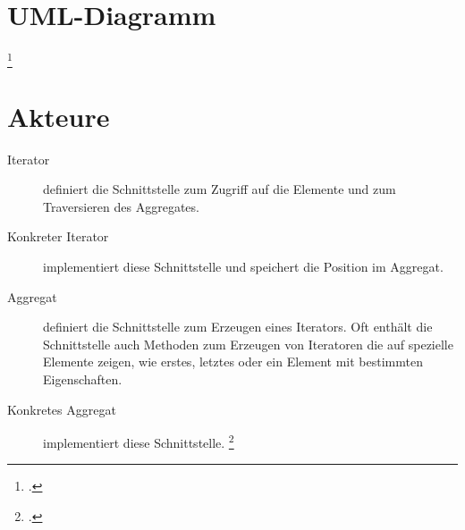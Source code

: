 \documentclass{bschlangaul-haupt}
\begin{document}
\section{UML-Diagramm}

\footcite{wiki:iterator}

%

\section{Akteure}

\begin{description}
\item[Iterator] definiert die Schnittstelle zum Zugriff auf die Elemente
und zum Traversieren des Aggregates.

\item[Konkreter Iterator] implementiert diese Schnittstelle und
speichert die Position im Aggregat.

\item[Aggregat] definiert die Schnittstelle zum Erzeugen eines
Iterators. Oft enthält die Schnittstelle auch Methoden zum Erzeugen von
Iteratoren die auf spezielle Elemente zeigen, wie \zB erstes, letztes
oder ein Element mit bestimmten Eigenschaften.

\item[Konkretes Aggregat] implementiert diese Schnittstelle.
\footcite{wiki:iterator}
\end{description}

\literatur
\end{document}
